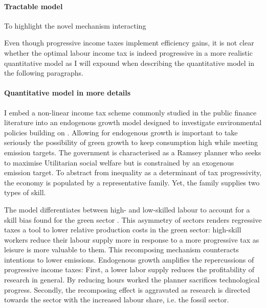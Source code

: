 \paragraph{Tractable model}
To highlight the novel mechanism interacting 

Even though progressive income taxes implement efficiency gains, it is not clear whether the optimal labour income tax is indeed progressive in a more realistic quantitative model as I will expound when describing the quantitative model in the following paragraphs. 

\paragraph{Quantitative model in more details}
I embed a non-linear income tax scheme commonly studied in the public finance literature \citep[e.g.][]{Heathcote2017OptimalFramework} into an endogenous growth model designed to investigate environmental policies building on \cite{Fried2018ClimateAnalysis}.  
Allowing for endogenous growth is important to take seriously the possibility of green growth to keep consumption high while meeting emission targets.
The government is characterised as a Ramsey planner who seeks to maximise Utilitarian social welfare but is constrained by an exogenous emission target. To abstract from inequality as a determinant of tax progressivity, the economy is populated by a representative family. Yet, the family supplies two types of skill. 

The model differentiates between high- and low-skilled labour to account for a skill bias found for the green sector \citep{Consoli2016DoCapital}. This asymmetry of sectors renders regressive taxes a tool to lower relative production costs in the green sector: high-skill workers reduce their labour supply more in response to a more progressive tax as leisure is more valuable to them. This recomposing mechanism counteracts intentions to lower emissions. %
Endogenous growth amplifies the repercussions of progressive income taxes:
First, a lower labor supply reduces the profitability of research in general. By reducing hours worked the planner sacrifices technological progress. Secondly, the recomposing effect is aggravated as research is directed towards the sector with the increased labour share, i.e. the fossil sector.

